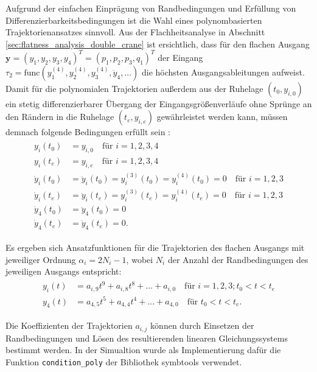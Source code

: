 Aufgrund der einfachen Einprägung von Randbedingungen und Erfüllung von Differenzierbarkeitsbedingungen ist die Wahl eines polynombasierten Trajektorienansatzes sinnvoll. Aus der Flachheitsanalyse in Abschnitt \ref{sec:flatness_analysis_double_crane} ist ersichtlich, dass für den flachen Ausgang ${\mathbf{y} = (y_1, y_2, y_3, y_4)^T = (p_1, p_2, p_3, q_1)^T}$ der Eingang $\tau_2 = \mathrm{func}(y_1^{(4)}, y_2^{(4)}, y_3^{(4)}, \ddot{y}_4, ...)$ die höchsten Ausgangsableitungen aufweist. Damit für die polynomialen Trajektorien außerdem aus der Ruhelage $(t_0, y_{i, 0})$  ein stetig differenzierbarer Übergang der Eingangsgrößenverläufe ohne Sprünge an den Rändern in die Ruhelage $(t_e, y_{i, e})$ gewährleistet werden kann, müssen demnach folgende Bedingungen erfüllt sein \cite[S. 230]{NLRT_Roebenack}:
\begin{align}
	\begin{split}
	y_i(t_0) &= y_{i, 0}  \quad \text{für } i = 1,2,3,4 \\
	y_i(t_e) &= y_{i, e}  \quad \text{für } i = 1,2,3,4 \\
	\dot{y}_i(t_0) &= \ddot{y}_i(t_0) = y_i^{(3)}(t_0) = y_i^{(4)}(t_0) = 0 \quad \text{für } i = 1,2,3 \\
	\dot{y}_i(t_e) &= \ddot{y}_i(t_e) = y_i^{(3)}(t_e) = y_i^{(4)}(t_e) = 0 \quad \text{für } i = 1,2,3 \\
	\dot{y}_4(t_0) &= \ddot{y}_4(t_0) = 0 \\
	\dot{y}_4(t_e) &= \ddot{y}_4(t_e) = 0.
	\end{split}
\end{align}

Es ergeben sich Ansatzfunktionen für die Trajektorien des flachen Ausgangs mit jeweiliger Ordnung $\alpha_i = 2 N_i - 1$, wobei $N_i$ der Anzahl der Randbedingungen des jeweiligen Ausgangs entspricht:
\begin{align}
	\begin{split}
	y_i(t) &= a_{i, 9} t^9 + a_{i, 8} t^8 + ... + a_{i, 0} \quad \text{für }  i = 1,2,3; t_0 < t < t_e \\
	y_4(t) &= a_{4, 5} t^5 + a_{4, 4} t^4 + ... + a_{4, 0} \quad \text{für } t_0 < t < t_e.
	\end{split}
\end{align}

Die Koeffizienten der Trajektorien $a_{i, j}$ können durch Einsetzen der Randbedingungen und Lösen des resultierenden linearen Gleichungssystems bestimmt werden. In der Simualtion wurde als Implementierung dafür die Funktion \texttt{condition\_poly} der Bibliothek symbtools verwendet.


